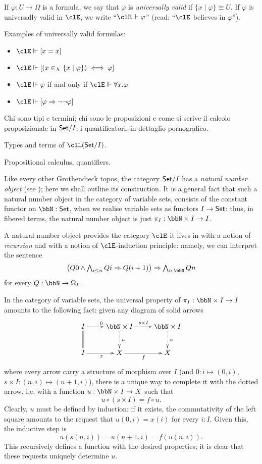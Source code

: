 If $\varphi : U\to\Omega$ is a formula, we say that $\varphi$ is \emph{universally valid} if $\{x\mid\varphi\}\cong U$. If $\varphi$ is universally valid in $\clE$, we write ``$\clE\Vdash \varphi$'' (read: ``$\clE$ believes in $\varphi$'').

Examples of universally valid formulas:
\begin{itemize}
	\item $\clE\Vdash [x=x]$
	\item $\clE\Vdash [(x \in_X \{x\mid\varphi\}) \iff \varphi]$
	\item $\clE\Vdash \varphi$ if and only if $\clE \Vdash \forall x.\varphi$
	\item $\clE\Vdash [\varphi \Rightarrow \lnot\lnot\varphi]$
\end{itemize}
Chi sono tipi e termini; chi sono le proposizioni e come si scrive il calcolo proposizionale in $\mathsf{Set}/I$; i quantificatori, in dettaglio pornografico.
\begin{definition}
	Types and terms of $\clL(\Set/I)$.
\end{definition}
\begin{definition}
	Propositional calculus, quantifiers.
\end{definition}
\begin{remark}
	Like every other Grothendieck topos, the category $\mathsf{Set}/I$ has a \emph{natural number object} (see \cite[??]{mac1992sheaves}); here we shall outline its construction. It is a general fact that such a natural number object in the category of variable sets, consists of the constant functor on $\bbN : \Set$, when we realise variable sets as functors $I \to \mathsf{Set}$: thus, in fibered terms, the natural number object is just $\pi_I : \bbN \times I \to I$.

	A natural number object provides the category $\clE$ it lives in with a notion of \emph{recursion} and with a notion of $\clE$-induction principle: namely, we can interpret the sentence
	\[\textstyle\big(Q0\land \bigwedge_{i\le n} Qi\Rightarrow Q(i+1)\big)\Rightarrow \bigwedge_{n : \bbN} Qn\]
	for every $Q : \bbN \to \Omega_I$.
	
	In the category of variable sets, the universal property of $\pi_I : \bbN\times I \to I$ amounts to the following fact: given any diagram of solid arrows 
	\[
	\xymatrix{
		I \ar[r]^0 \ar@{=}[d] & \bbN\times I\ar@{.>}[d]^u \ar[r]^{s\times I} & \bbN \times I\ar@{.>}[d]^u \\ 
		I \ar[r]_x & X \ar[r]_f & X
	}	
	\]
	where every arrow carry a structure of morphism over $I$ (and $0 : i \mapsto (0,i)$, $s\times I : (n,i) \mapsto (n+1,i)$), there is a unique way to complete it with the dotted arrow, i.e. with a function $u : \bbN \times I \to X$ such that 
	\[u \circ (s\times I) = f \circ u.\]
	Clearly, $u$ must be defined by induction: if it exists, the commutativity of the left square amounts to the request that $u(0,i)=x(i)$ for every $i : I$. Given this, the inductive step is 
	\[ 
		u(s(n,i)) = u(n+1,i) = f(u(n,i)).
	\]
	This recursively defines a function with the desired properties; it is clear that these requests uniquely determine $u$.
\end{remark}
